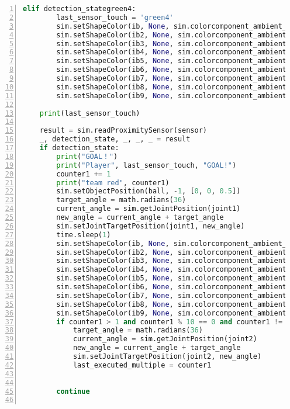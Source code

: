 \begin{lstlisting}[language=Python, frame=single, numbers=left, captionpos=b, basicstyle=\ttfamily\small, showstringspaces=false, breaklines=true, tabsize=4, xleftmargin=15pt]
    elif detection_stategreen4:
        last_sensor_touch = 'green4'
        sim.setShapeColor(ib, None, sim.colorcomponent_ambient_diffuse, [0, 1, 0])
        sim.setShapeColor(ib2, None, sim.colorcomponent_ambient_diffuse, [0, 1, 0])
        sim.setShapeColor(ib3, None, sim.colorcomponent_ambient_diffuse, [1, 1, 1])
        sim.setShapeColor(ib4, None, sim.colorcomponent_ambient_diffuse, [0, 0, 0])
        sim.setShapeColor(ib5, None, sim.colorcomponent_ambient_diffuse, [0, 0, 0])
        sim.setShapeColor(ib6, None, sim.colorcomponent_ambient_diffuse, [0, 0, 0])
        sim.setShapeColor(ib7, None, sim.colorcomponent_ambient_diffuse, [1, 1, 1])
        sim.setShapeColor(ib8, None, sim.colorcomponent_ambient_diffuse, [0, 0, 0])
        sim.setShapeColor(ib9, None, sim.colorcomponent_ambient_diffuse, [1, 1, 1])
 
    print(last_sensor_touch)
 
    result = sim.readProximitySensor(sensor)
    _, detection_state, _, _, _ = result
    if detection_state:
        print("GOAL！")
        print("Player", last_sensor_touch, "GOAL!")
        counter1 += 1
        print("team red", counter1)
        sim.setObjectPosition(ball, -1, [0, 0, 0.5])
        target_angle = math.radians(36)
        current_angle = sim.getJointPosition(joint1)
        new_angle = current_angle + target_angle
        sim.setJointTargetPosition(joint1, new_angle)
        time.sleep(1)
        sim.setShapeColor(ib, None, sim.colorcomponent_ambient_diffuse, [0, 0, 1])
        sim.setShapeColor(ib2, None, sim.colorcomponent_ambient_diffuse, [0, 0, 1])
        sim.setShapeColor(ib3, None, sim.colorcomponent_ambient_diffuse, [1, 1, 1])
        sim.setShapeColor(ib4, None, sim.colorcomponent_ambient_diffuse, [1, 1, 1])
        sim.setShapeColor(ib5, None, sim.colorcomponent_ambient_diffuse, [1, 1, 1])
        sim.setShapeColor(ib6, None, sim.colorcomponent_ambient_diffuse, [0, 0, 0])
        sim.setShapeColor(ib7, None, sim.colorcomponent_ambient_diffuse, [1, 1, 1])
        sim.setShapeColor(ib8, None, sim.colorcomponent_ambient_diffuse, [1, 1, 1])
        sim.setShapeColor(ib9, None, sim.colorcomponent_ambient_diffuse, [1, 1, 1])
        if counter1 > 1 and counter1 % 10 == 0 and counter1 != last_executed_multiple + 1:
            target_angle = math.radians(36)
            current_angle = sim.getJointPosition(joint2)
            new_angle = current_angle + target_angle
            sim.setJointTargetPosition(joint2, new_angle)
            last_executed_multiple = counter1
 
 
        continue
 

\end{lstlisting}
